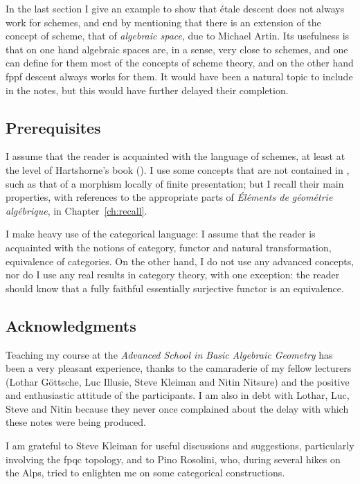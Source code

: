 \begin{0   INTRODUCTION}
In the last section I give an example to show that \'etale descent does not always work for schemes, and end by mentioning that there is an extension of the concept of scheme, that of \emph{algebraic space}, due to Michael Artin. Its usefulness is that on one hand algebraic spaces are, in a sense, very close to schemes, and one can define for them most of the concepts of scheme theory, and on the other hand fppf descent always works for them. It would have been a natural topic to include in the notes, but this would have further delayed their completion.


\subsection*{Prerequisites}

I assume that the reader is acquainted with the language of schemes, at least at the level of Hartshorne's book (\cite{hartshorne}). I use some concepts that are not contained in \cite{hartshorne}, such as that of a morphism locally of finite presentation; but I recall their main properties, with references to the appropriate parts of \emph{\'{E}l\'ements de g\'eom\'etrie alg\'ebrique}, in Chapter~\ref{ch:recall}. 

I make heavy use of the categorical language: I assume that the reader is acquainted with the notions of category, functor and natural transformation, equivalence of categories. On the other hand, I do not use any advanced concepts, nor do I use any real results in category theory, with one exception: the reader should know that a fully faithful essentially surjective functor is an equivalence.



\subsection*{Acknowledgments} Teaching my course at the \emph{Advanced School in Basic Algebraic Geometry} has been a very pleasant experience, thanks to the camaraderie of my fellow lecturers (Lothar G\"ottsche, Luc Illusie, Steve Kleiman and Nitin Nitsure) and the positive and enthusiastic attitude of the participants. I am also in debt with Lothar, Luc, Steve and Nitin because they never once complained about the delay with which these notes were being produced.

I am grateful to Steve Kleiman for useful discussions and suggestions, particularly involving the fpqc topology, and to Pino Rosolini, who, during several hikes on the Alps, tried to enlighten me on some categorical constructions.


\end{0   INTRODUCTION}

